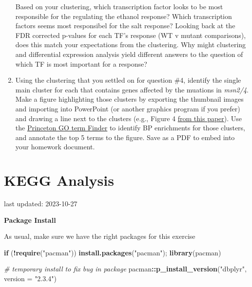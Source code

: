 \documentclass[
]{book}
\newenvironment{Shaded}{\begin{snugshade}}{\end{snugshade}}
\newcommand{\AttributeTok}[1]{\textcolor[rgb]{0.13,0.29,0.53}{#1}}
\newcommand{\CommentTok}[1]{\textcolor[rgb]{0.56,0.35,0.01}{\textit{#1}}}
\newcommand{\ControlFlowTok}[1]{\textcolor[rgb]{0.13,0.29,0.53}{\textbf{#1}}}
\newcommand{\FunctionTok}[1]{\textcolor[rgb]{0.13,0.29,0.53}{\textbf{#1}}}
\newcommand{\NormalTok}[1]{#1}
\newcommand{\SpecialCharTok}[1]{\textcolor[rgb]{0.81,0.36,0.00}{\textbf{#1}}}
\newcommand{\StringTok}[1]{\textcolor[rgb]{0.31,0.60,0.02}{#1}}
\begin{document}
\begin{enumerate}
  Based on your clustering, which transcription factor looks to be most responsible for the regulating the ethanol response? Which transcription factors seems most responsibel for the salt response? Looking back at the FDR corrected p-values for each TF's response (WT v mutant comparisons), does this match your expectations from the clustering. Why might clustering and differential expression analysis yield different answers to the question of which TF is most important for a response?
\item
  Using the clustering that you settled on for question \#4, identify the single main cluster for each that contains genes affected by the muations in \emph{msn2/4}. Make a figure highlighting those clusters by exporting the thumbnail images and importing into PowerPoint (or another graphics program if you prefer) and drawing a line next to the clusters (e.g., Figure 4 \href{https://pubmed.ncbi.nlm.nih.gov/32027144/}{from this paper}). Use the \href{https://go.princeton.edu/cgi-bin/GOTermFinder}{Princeton GO term Finder} to identify BP enrichments for those clusters, and annotate the top 5 terms to the figure. Save as a PDF to embed into your homework document.
\end{enumerate}

\hypertarget{kegg-analysis}{%
\chapter{KEGG Analysis}\label{kegg-analysis}}

last updated: 2023-10-27

\textbf{Package Install}

As usual, make sure we have the right packages for this exercise

\begin{Shaded}
\begin{Highlighting}[]
\ControlFlowTok{if}\NormalTok{ (}\SpecialCharTok{!}\FunctionTok{require}\NormalTok{(}\StringTok{"pacman"}\NormalTok{)) }\FunctionTok{install.packages}\NormalTok{(}\StringTok{"pacman"}\NormalTok{); }\FunctionTok{library}\NormalTok{(pacman)}

\CommentTok{\# temporary install to fix bug in package}
\NormalTok{pacman}\SpecialCharTok{::}\FunctionTok{p\_install\_version}\NormalTok{(}\StringTok{"dbplyr"}\NormalTok{, }\AttributeTok{version =} \StringTok{"2.3.4"}\NormalTok{)}
\end{Highlighting}
\end{Shaded}
\end{document}
